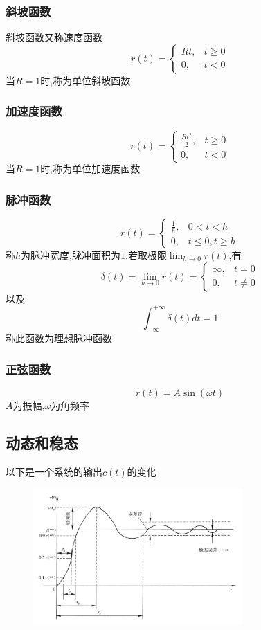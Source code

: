 \documentclass[12pt,a4paper,oneside]{ctexart}
\begin{document}
\subsubsection{斜坡函数}
斜坡函数又称速度函数
\[
    r(t)=\begin{cases}
        Rt,&t\geqslant 0\\
        0,&t < 0
    \end{cases}
\]
当$R=1$时,称为单位斜坡函数

\subsubsection{加速度函数}
\[
    r(t)=\begin{cases}
        \frac{Rt^2}{2},&t\geqslant 0\\
        0,&t < 0
    \end{cases}
\]
当$R=1$时,称为单位加速度函数

\subsubsection{脉冲函数}
\[
    r(t)=\begin{cases}
        \frac{1}{h},&0<t<h\\
        0,&t\leqslant 0,t\geqslant h
    \end{cases}
\]
称$h$为脉冲宽度,脉冲面积为$1$.若取极限$\lim_{h\to 0}r(t)$,有
\[
    \delta(t)=\lim_{h\to 0}r(t)=\begin{cases}
        \infty,&t=0\\
        0,&t\neq 0
    \end{cases}
\]
以及
\[
    \int_{-\infty}^{+\infty}\delta(t)dt=1
\]
称此函数为理想脉冲函数

\subsubsection{正弦函数}
\[
    r(t)=A\sin (\omega t)
\]
$A$为振幅,$\omega$为角频率

\subsection{动态和稳态}
以下是一个系统的输出$c(t)$的变化
\begin{figure}[H]
    \centering
    \includegraphics[width=8cm]{photos/系统动态性能指标.png}
\end{figure}
\end{document}
